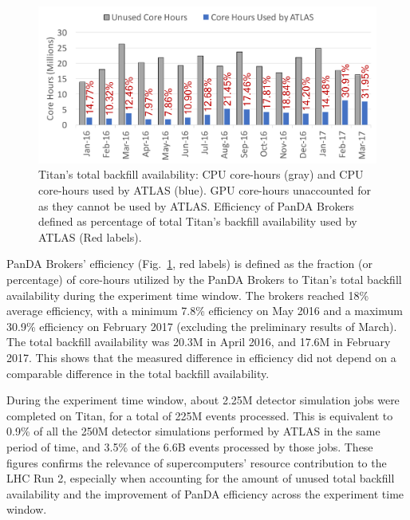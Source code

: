 \begin{figure}[!t]
    \includegraphics[clip,width=\columnwidth]{figures/backfill_consumption.pdf}
    \vspace{-0.3in}
    \caption{Titan's total backfill availability: CPU core-hours (gray) and
    CPU core-hours used by ATLAS (blue). GPU core-hours unaccounted for as
    they cannot be used by ATLAS\@. Efficiency of PanDA Brokers defined as
    percentage of total Titan's backfill availability used by ATLAS (Red
    labels).}\label{fig:backfill-utilization}
\end{figure}

PanDA Brokers' efficiency (Fig.~\ref{fig:backfill-utilization}, red labels)
is defined as the fraction (or percentage) of core-hours utilized by the
PanDA Brokers to Titan’s total backfill availability during the experiment
time window. The brokers reached 18\% average efficiency, with a minimum
7.8\% efficiency on May 2016 and a maximum 30.9\% efficiency on February 2017
(excluding the preliminary results of March). The total backfill availability
was 20.3M in April 2016, and 17.6M in February 2017. This shows that the
measured difference in efficiency did not depend on a comparable difference
in the total backfill availability.

During the experiment time window, about 2.25M detector simulation jobs were
completed on Titan, for a total of 225M events processed. This is equivalent
to 0.9\% of all the 250M detector simulations performed by ATLAS in the same
period of time, and 3.5\% of the 6.6B events processed by those jobs. These
figures confirms the relevance of supercomputers' resource contribution to
the LHC Run 2, especially when accounting for the amount of unused total
backfill availability and the improvement of PanDA efficiency across the
experiment time window.

